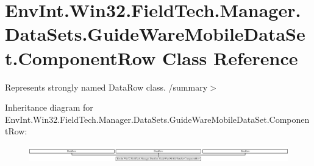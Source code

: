 \hypertarget{class_env_int_1_1_win32_1_1_field_tech_1_1_manager_1_1_data_sets_1_1_guide_ware_mobile_data_set_1_1_component_row}{}\section{Env\+Int.\+Win32.\+Field\+Tech.\+Manager.\+Data\+Sets.\+Guide\+Ware\+Mobile\+Data\+Set.\+Component\+Row Class Reference}
\label{class_env_int_1_1_win32_1_1_field_tech_1_1_manager_1_1_data_sets_1_1_guide_ware_mobile_data_set_1_1_component_row}


Represents strongly named Data\+Row class. /summary$>$  


Inheritance diagram for Env\+Int.\+Win32.\+Field\+Tech.\+Manager.\+Data\+Sets.\+Guide\+Ware\+Mobile\+Data\+Set.\+Component\+Row\+:\begin{figure}[H]
\begin{center}
\leavevmode
\includegraphics[height=0.742213cm]{class_env_int_1_1_win32_1_1_field_tech_1_1_manager_1_1_data_sets_1_1_guide_ware_mobile_data_set_1_1_component_row}
\end{center}
\end{figure}
